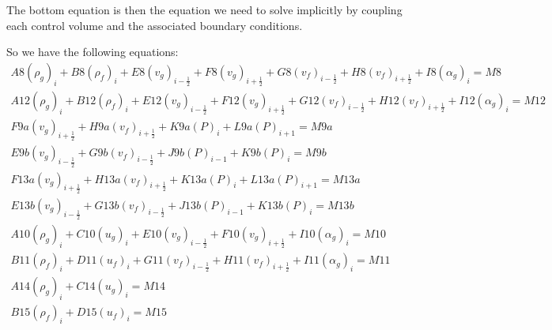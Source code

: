 \documentclass[11pt,letterpaper,titlepage]{article}
\newcommand{\half}{\frac{1}{2}}
\begin{document}
\newline
\noindent
The bottom equation is then the equation we need to solve implicitly by coupling each control volume and the associated boundary conditions.

So we have the following equations:
\begin{equation*}
\begin{aligned}
A8  (\rho_g)_i  + B8  (\rho_f)_i  +                               E8   (v_g)_{i-\half}  + F8   (v_g)_{i+\half} + G8   (v_f)_{i-\half} + H8   (v_f)_{i+\half} + I8  (\alpha_g)_i                                                  =M8  \\ 
A12 (\rho_g)_i  + B12 (\rho_f)_i  +                               E12  (v_g)_{i-\half}  + F12  (v_g)_{i+\half} + G12  (v_f)_{i-\half} + H12  (v_f)_{i+\half} + I12 (\alpha_g)_i                                                  =M12 \\
                                                                                          F9a  (v_g)_{i+\half}                        + H9a  (v_f)_{i+\half}                                      + K9a  (P)_{i} + L9a  (P)_{i+1}=M9a \\ 
                                                                  E9b  (v_g)_{i-\half}                         + G9b  (v_f)_{i-\half}                                            + J9b  (P)_{i-1} + K9b  (P)_{i}                 =M9b \\ 
                                                                                          F13a (v_g)_{i+\half} +                        H13a (v_f)_{i+\half} +                                      K13a (P)_{i} + L13a (P)_{i+1}=M13a\\ 
                                                                  E13b (v_g)_{i-\half}  +                        G13b (v_f)_{i-\half}                                            + J13b (P)_{i-1} + K13b (P)_{i}                 =M13b\\ 
A10 (\rho_g)_i                    + C10 (u_g)_i                 + E10  (v_g)_{i-\half}  + F10  (v_g)_{i+\half}                           + I10 (\alpha_g)_i                                                                      =M10 \\ 
                  B11 (\rho_f)_i                 + D11 (u_f)_i                                                 + G11  (v_f)_{i-\half} + H11  (v_f)_{i+\half} + I11 (\alpha_g)_i                                                  =M11 \\ 
A14 (\rho_g)_i                    + C14 (u_g)_i                                                                                                                                                                                  =M14 \\ 
                  B15 (\rho_f)_i                 + D15 (u_f)_i                                                                                                                                                                   =M15 \\
\end{aligned}
\end{equation*}
\end{document}
